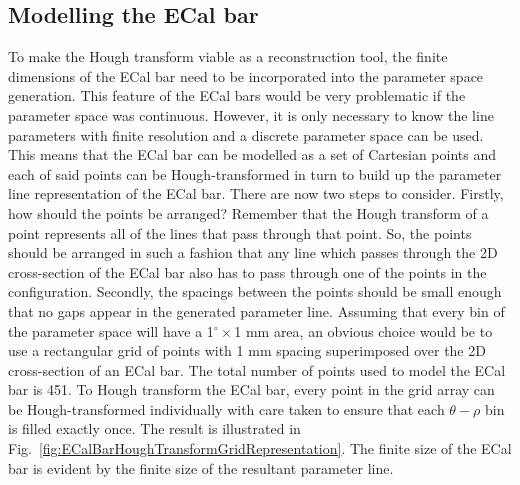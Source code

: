 \subsection{Modelling the ECal bar}
\label{subsec:ECalBarModel}
To make the Hough transform viable as a reconstruction tool, the finite dimensions of the ECal bar need to be incorporated into the parameter space generation.  This feature of the ECal bars would be very problematic if the parameter space was continuous.  However, it is only necessary to know the line parameters with finite resolution and a discrete parameter space can be used.  This means that the ECal bar can be modelled as a set of Cartesian points and each of said points can be Hough-transformed in turn to build up the parameter line representation of the ECal bar.
\newline
\newline
There are now two steps to consider.  Firstly, how should the points be arranged?  Remember that the Hough transform of a point represents all of the lines that pass through that point.  So, the points should be arranged in such a fashion that any line which passes through the 2D cross-section of the ECal bar also has to pass through one of the points in the configuration.  Secondly, the spacings between the points should be small enough that no gaps appear in the generated parameter line.  
\newline
\newline
Assuming that every bin of the parameter space will have a 1$^\circ\times$1 mm area, an obvious choice would be to use a rectangular grid of points with 1 mm spacing superimposed over the 2D cross-section of an ECal bar.  The total number of points used to model the ECal bar is 451.  To Hough transform the ECal bar, every point in the grid array can be Hough-transformed individually with care taken to ensure that each $\theta-\rho$ bin is filled exactly once.  The result is illustrated in Fig.~\ref{fig:ECalBarHoughTransformGridRepresentation}.  The finite size of the ECal bar is evident by the finite size of the resultant parameter line.
